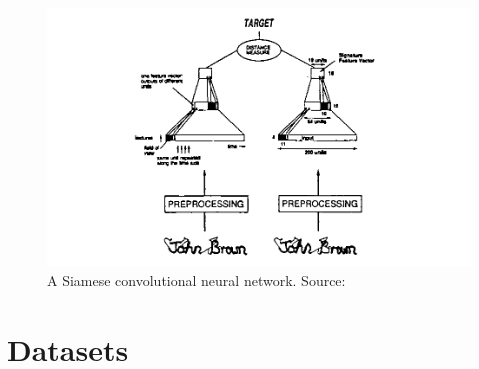 \begin{frame}
\begin{figure}
\begin{center}
\includegraphics[width=1.47\textheight, height=0.9\textheight]{figs/diagramm/bromley94}
\end{center}
\vspace{-0.3cm}%
\caption{A Siamese convolutional neural network. Source: \textcite{bromley94}}
\end{figure}
\end{frame}

\section{Datasets}

